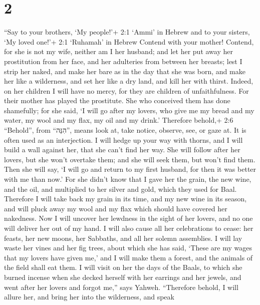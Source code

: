 \hypertarget{section-1}{%
\section{2}\label{section-1}}

 ``Say to your brothers, `My people!'+ 2:1 `Ammi' in Hebrew
and to your sisters, `My loved one!'+ 2:1 `Ruhamah' in Hebrew
 Contend with your mother! Contend, for she is not my wife,
neither am I her husband; and let her put away her prostitution from her
face, and her adulteries from between her breasts;  lest I
strip her naked, and make her bare as in the day that she was born, and
make her like a wilderness, and set her like a dry land, and kill her
with thirst.  Indeed, on her children I will have no mercy,
for they are children of unfaithfulness.  For their mother
has played the prostitute. She who conceived them has done shamefully;
for she said, `I will go after my lovers, who give me my bread and my
water, my wool and my flax, my oil and my drink.'  Therefore
behold,+ 2:6 ``Behold'', from ``הִנֵּה'', means look at, take notice,
observe, see, or gaze at. It is often used as an interjection. I will
hedge up your way with thorns, and I will build a wall against her, that
she can't find her way.  She will follow after her lovers,
but she won't overtake them; and she will seek them, but won't find
them. Then she will say, `I will go and return to my first husband, for
then it was better with me than now.'  For she didn't know
that I gave her the grain, the new wine, and the oil, and multiplied to
her silver and gold, which they used for Baal.  Therefore I
will take back my grain in its time, and my new wine in its season, and
will pluck away my wool and my flax which should have covered her
nakedness.  Now I will uncover her lewdness in the sight of
her lovers, and no one will deliver her out of my hand.  I
will also cause all her celebrations to cease: her feasts, her new
moons, her Sabbaths, and all her solemn assemblies.  I will
lay waste her vines and her fig trees, about which she has said, `These
are my wages that my lovers have given me,' and I will make them a
forest, and the animals of the field shall eat them.  I
will visit on her the days of the Baals, to which she burned incense
when she decked herself with her earrings and her jewels, and went after
her lovers and forgot me,'' says Yahweh.  ``Therefore
behold, I will allure her, and bring her into the wilderness, and speak
